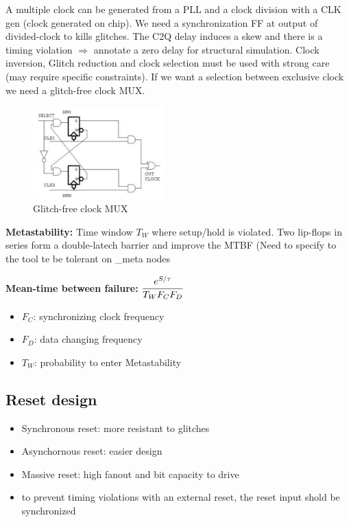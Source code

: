 A multiple clock can be generated from a PLL and a clock division with a CLK gen (clock generated on chip). We need a synchronization FF at output of divided-clock to kills glitches. The C2Q delay induces a skew and there is a timing violation \(\Rightarrow\) annotate a zero delay for structural simulation.
\bigbreak
Clock inversion, Glitch reduction and clock selection must be used with strong care (may require specific constraints).
\bigbreak
If we want a selection between exclusive clock we need a glitch-free clock MUX.

\begin{figure}[!ht]
  \centering
  \includegraphics[width=0.45\textwidth]{Images/glitch_free_mux.png}
  \caption{Glitch-free clock MUX}
  \label{glitch-free MUX}
\end{figure}


\textbf{Metastability:} Time window \(T_W\) where setup/hold is violated. Two lip-flops in series form a double-latech barrier and improve the MTBF (Need to specify to the tool te be tolerant on \_meta nodes

\textbf{Mean-time between failure:} \( \cfrac{e^{S/\tau}}{T_WF_CF_D}\)
\begin{itemize}
  \item \(F_C\): synchronizing clock frequency
  \item \(F_D\): data changing frequency
\item \(T_W\): probability to enter Metastability
\end{itemize}


\subsection{Reset design}
\begin{itemize}
  \item Synchronous reset: more resistant to glitches
  \item Asynchornous reset: easier design
  \item Massive reset: high fanout and bit capacity to drive
  \item to prevent timing violations with an external reset, the reset input shold be synchronized
\end{itemize}

